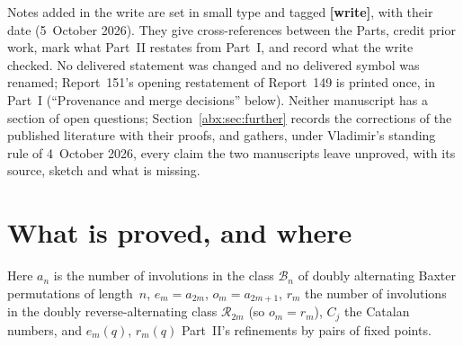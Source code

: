 \documentclass[11pt,letterpaper]{article}
\numberwithin{equation}{section}
\theoremstyle{remark}\newtheorem{remark}[theorem]{Remark}
\newcommand{\BB}{\mathcal B}
\newcommand{\RR}{\mathcal R}
\begin{document}
Notes added in the write are set in small type and tagged \textbf{[write]}, with their date (5~October 2026). They give cross-references between the Parts, credit prior work, mark what Part~II restates from Part~I, and record what the write checked. No delivered statement was changed and no delivered symbol was renamed; Report~151's opening restatement of Report~149 is printed once, in Part~I (``Provenance and merge decisions'' below). Neither manuscript has a section of open questions; Section~\ref{abx:sec:further} records the corrections of the published literature with their proofs, and gathers, under Vladimir's standing rule of 4~October 2026, every claim the two manuscripts leave unproved, with its source, sketch and what is missing.

\section*{What is proved, and where}\label{abx:sec:status}
Here $a_n$ is the number of involutions in the class $\BB_n$ of doubly alternating Baxter permutations of length~$n$, $e_m=a_{2m}$, $o_m=a_{2m+1}$, $r_m$ the number of involutions in the doubly reverse-alternating class $\RR_{2m}$ (so $o_m=r_m$), $C_j$ the Catalan numbers, and $e_m(q)$, $r_m(q)$ Part~II's refinements by pairs of fixed points.
\end{document}
